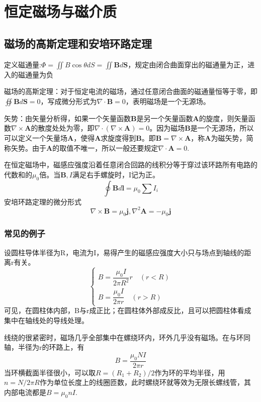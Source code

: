 \section{恒定磁场与磁介质}
\subsection{磁场的高斯定理和安培环路定理}
定义磁通量:$\varPhi=\iint B\cos \theta dS=\iint \bm{B}d\bm{S}$，规定由闭合曲面穿出的磁通量为正，进入的磁通量为负

磁场的高斯定理：对于恒定电流的磁场，通过任意闭合曲面的磁通量恒等于零，即$\oiint \bm{B}d\bm{S}=0$，写成微分形式为$\nabla \cdot \bm{B}=0$，表明磁场是一个无源场。

矢势：由矢量分析得，如果一个矢量函数$\bm{B}$是另一个矢量函数$\bm{A}$的旋度，则矢量函数$\nabla \times \bm{A}$的散度处处为零，即$\nabla \cdot (\nabla \times \bm{A})=0$。因为磁场$\bm{B}$是一个无源场，所以可以定义一个矢量场$\bm{A}$，使得$\bm{A}$求旋度得到$\bm{B}$。即$\bm{B}=\nabla \times \bm{A}$，称$\bm{A}$为磁矢势，简称矢势。由于$\bm{A}$的取值不唯一，所以一般还要规定$\nabla \cdot \bm{A}=0$.

{\color{Red}}在恒定磁场中，磁感应强度沿着任意闭合回路的线积分等于穿过该环路所有电路的代数和的$\mu_0$倍。当$\bm{B},I$满足右手螺旋时，I记为正。
\begin{equation}
    \label{安培环路定律}
    \oint \bm{B}d\bm{l}=\mu_0 \sum I_i
\end{equation}
安培环路定理的微分形式
\begin{equation}
    \nabla \times \bm{B}=\mu_0 \bm{j},\nabla ^2 \bm{A}=-\mu_0 \bm{j}
\end{equation}
\subsubsection{常见的例子}
设圆柱导体半径为R，电流为I，易得产生的磁感应强度大小只与场点到轴线的距离r有关。
\begin{equation}
    \begin{cases}
        B=\dfrac{\mu_0 I}{2\pi R^2}r \quad (r<R)\\
        B=\dfrac{\mu_0 I}{2\pi r} \quad (r>R)
    \end{cases}
\end{equation}
可见，在圆柱体内部，B与r成正比；在圆柱体外部成反比，且可以把圆柱体看成集中在轴线处的导线处理。

线绕的很紧密时，磁场几乎全部集中在螺绕环内，环外几乎没有磁场。在与环同轴，半径为r的环路上，有
\begin{equation}
    B=\dfrac{\mu_0 NI}{2\pi r}
\end{equation}
当环横截面半径很小，可以取$R=(R_1+R_2)/2$作为环的平均半径，用$n=N/2\pi R$作为单位长度上的线圈匝数，此时螺绕环就等效为无限长螺线管，其内部电流都是$B=\mu_0 n I$.
